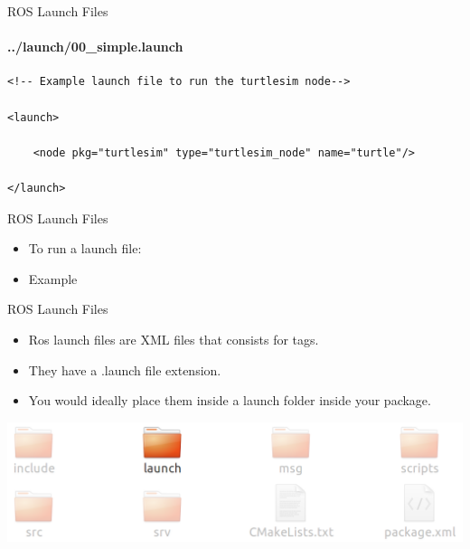 \documentclass{beamer}
\begin{document}
\begin{frame}[fragile]{ROS Launch Files}
    \framesubtitle{../launch/00\_simple.launch}
    \begin{lstlisting}
<!-- Example launch file to run the turtlesim node-->

<launch>

    <node pkg="turtlesim" type="turtlesim_node" name="turtle"/>

</launch>
    \end{lstlisting}
\end{frame}


\begin{frame}{ROS Launch Files}
    \begin{itemize}
        \item To run a launch file:
             \begin{terminal}
                 \color{green} 
              \end{terminal}
              
        \item Example
        \begin{terminal}
            \color{green} 
          \end{terminal}              
    \end{itemize}  
\end{frame}


\begin{frame}{ROS Launch Files}
    \begin{itemize}
        \item Ros launch files are XML files that consists for tags.
        
        
        \item They have a {\ttfamily \colorbox{gray!30!white}{.launch}} file extension.
        
        \item You would ideally place them inside a {\ttfamily \colorbox{gray!30!white}{launch}} folder inside your package.
    \end{itemize}  
    \includegraphics[width=1.0\linewidth]{figures/package2.png}
\end{frame}
\end{document}
